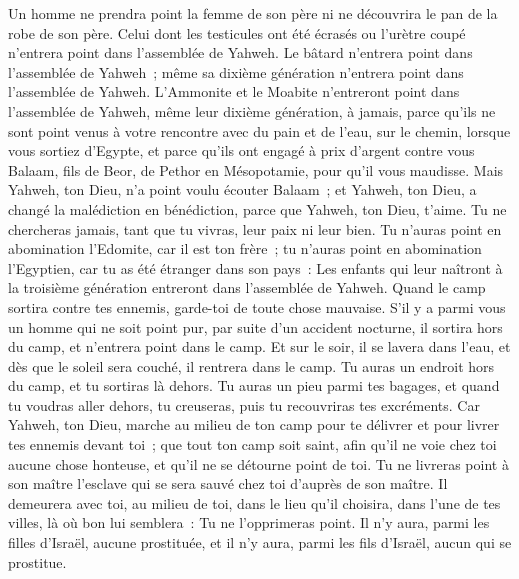 \begin{multicols}{2}
Un homme ne prendra point la femme de son père ni ne découvrira le pan de la robe de son père.
\VerseOne{}Celui dont les testicules ont été écrasés ou l'urètre coupé n'entrera point dans l'assemblée de Yahweh.
Le bâtard n'entrera point dans l'assemblée de Yahweh~; même sa dixième génération n'entrera point dans l'assemblée de Yahweh.
L'Ammonite et le Moabite n'entreront point dans l'assemblée de Yahweh, même leur dixième génération, à jamais,
parce qu'ils ne sont point venus à votre rencontre avec du pain et de l'eau, sur le chemin, lorsque vous sortiez d'Egypte, et parce qu'ils ont engagé à prix d'argent contre vous Balaam, fils de Beor, de Pethor en Mésopotamie, pour qu'il vous maudisse.
Mais Yahweh, ton Dieu, n'a point voulu écouter Balaam~; et Yahweh, ton Dieu, a changé la malédiction en bénédiction, parce que Yahweh, ton Dieu, t'aime.
Tu ne chercheras jamais, tant que tu vivras, leur paix ni leur bien.
Tu n'auras point en abomination l'Edomite, car il est ton frère~; tu n'auras point en abomination l'Egyptien, car tu as été étranger dans son pays~:
Les enfants qui leur naîtront à la troisième génération entreront dans l'assemblée de Yahweh.
Quand le camp sortira contre tes ennemis, garde-toi de toute chose mauvaise.
S'il y a parmi vous un homme qui ne soit point pur, par suite d'un accident nocturne, il sortira hors du camp, et n'entrera point dans le camp.
Et sur le soir, il se lavera dans l'eau, et dès que le soleil sera couché, il rentrera dans le camp.
Tu auras un endroit hors du camp, et tu sortiras là dehors.
Tu auras un pieu parmi tes bagages, et quand tu voudras aller dehors, tu creuseras, puis tu recouvriras tes excréments.
Car Yahweh, ton Dieu, marche au milieu de ton camp pour te délivrer et pour livrer tes ennemis devant toi~; que tout ton camp soit saint, afin qu'il ne voie chez toi aucune chose honteuse, et qu'il ne se détourne point de toi.
Tu ne livreras point à son maître l'esclave qui se sera sauvé chez toi d'auprès de son maître.
Il demeurera avec toi, au milieu de toi, dans le lieu qu'il choisira, dans l'une de tes villes, là où bon lui semblera~: Tu ne l'opprimeras point.
Il n'y aura, parmi les filles d'Israël, aucune prostituée, et il n'y aura, parmi les fils d'Israël, aucun qui se prostitue.

\end{multicols}
